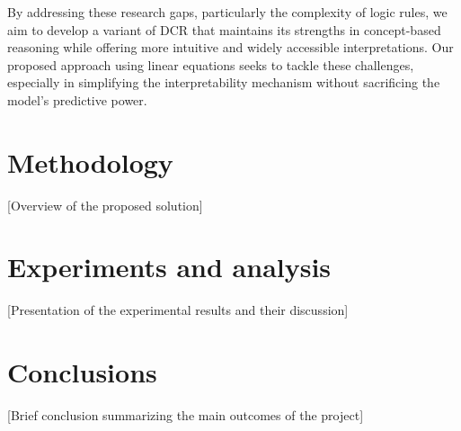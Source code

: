 \documentclass[sigconf, nonacm]{acmart}
\begin{document}
By addressing these research gaps, particularly the complexity of logic rules, we aim to develop a variant of DCR that maintains its strengths in concept-based reasoning while offering more intuitive and widely accessible interpretations. Our proposed approach using linear equations seeks to tackle these challenges, especially in simplifying the interpretability mechanism without sacrificing the model's predictive power.

\section{Methodology}
[Overview of the proposed solution]


\section{Experiments and analysis}
[Presentation of the experimental results and their discussion]



\section{Conclusions}
[Brief conclusion summarizing the main outcomes of the project]




\end{document}

